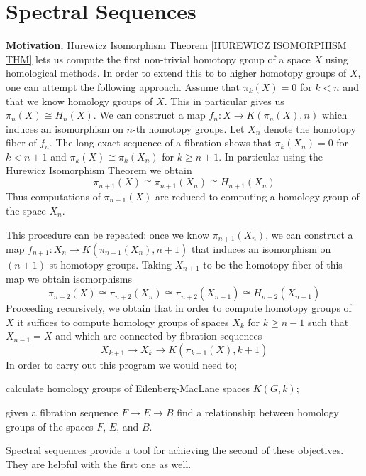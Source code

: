 

\chapter[Spectral Sequences]{Spectral Sequences}
\label{SPECTRAL SEQUENCES CHAPTER}
\thispagestyle{firststyle}

\begin{nn}{\bf Motivation.}
Hurewicz Isomorphism Theorem \ref{HUREWICZ ISOMORPHISM THM} lets us compute
the first non-trivial homotopy group of a space $X$ using homological methods. 
In order to extend this to to higher homotopy groups of $X$, one can attempt the following 
approach. Assume that $\pi_{k}(X) = 0$ for $k < n$ and that we know 
homology groups of $X$. This in particular gives us $\pi_{n}(X) \cong H_{n}(X)$.
We can construct a map $f_{n}\colon X \to K(\pi_{n}(X), n)$ which induces an isomorphism 
on $n$-th homotopy groups. Let $X_{n}$ denote the homotopy fiber of $f_{n}$. 
The long exact sequence of a fibration shows that $\pi_{k}(X_{n}) = 0$ for $k < n+1$
and $\pi_{k}(X) \cong \pi_{k}(X_{n})$ for $k\geq n+1$. In particular using 
the Hurewicz Isomorphism Theorem we obtain 
\[
\pi_{n+1}(X) \cong \pi_{n+1}(X_{n}) \cong H_{n+1}(X_{n})
\]
Thus computations of $\pi_{n+1}(X)$ are reduced to computing a homology group of
the space $X_{n}$.

This procedure can be repeated: once we know $ \pi_{n+1}(X_{n})$, 
we can construct a map $f_{n+1} \colon X_{n} \to K(\pi_{n+1}(X_{n}), n+1)$
that induces an isomorphism on $(n+1)$-st homotopy groups. Taking $X_{n+1}$
to be the homotopy fiber of this map we obtain isomorphisms
\[
\pi_{n+2}(X) \cong \pi_{n+2}(X_{n}) \cong \pi_{n+2}(X_{n+1}) \cong H_{n+2}(X_{n+1})
\]
Proceeding recursively, we obtain that in order to compute homotopy groups of $X$ 
it suffices to compute homology groups of spaces $X_{k}$ for $k\geq n-1$ such 
that $X_{n-1} = X$ and which are connected by fibration sequences
\[
X_{k+1} \to X_{k} \to K(\pi_{k+1}(X), k+1)
\]   
In order to carry out this program we would need to; 
\bit
\item calculate homology groups of Eilenberg-MacLane spaces $K(G, k)$;
\item given a fibration sequence $F \to E \to B$ find a relationship between 
homology groups of the spaces $F$, $E$, and $B$. 
\eit
\end{nn}
\vskip -6mm

Spectral sequences provide a tool for achieving the second of these objectives. 
They are helpful with the first one as well.



